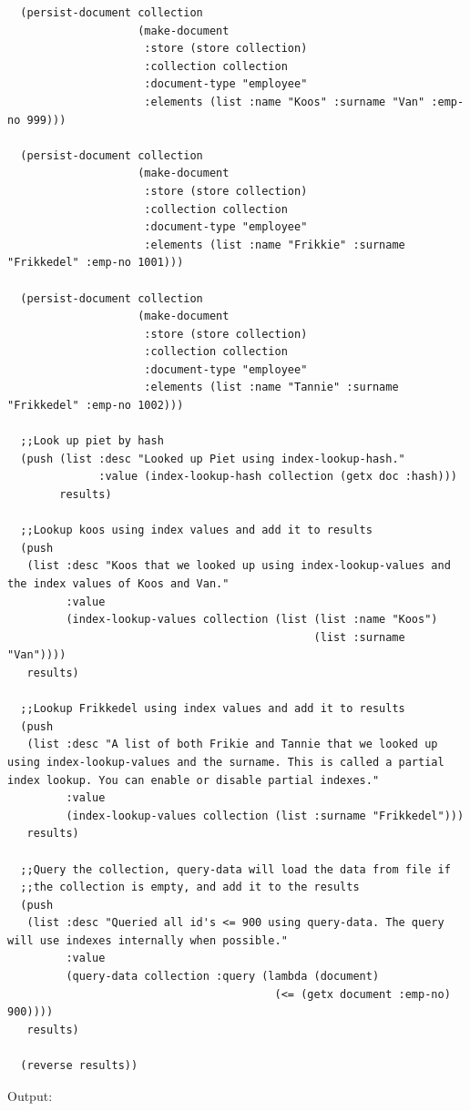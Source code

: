 \documentclass[11pt]{article}
\begin{document}
\begin{verbatim}
  (persist-document collection
                    (make-document
                     :store (store collection)
                     :collection collection
                     :document-type "employee"
                     :elements (list :name "Koos" :surname "Van" :emp-no 999)))

  (persist-document collection
                    (make-document
                     :store (store collection)
                     :collection collection
                     :document-type "employee"
                     :elements (list :name "Frikkie" :surname "Frikkedel" :emp-no 1001)))

  (persist-document collection
                    (make-document
                     :store (store collection)
                     :collection collection
                     :document-type "employee"
                     :elements (list :name "Tannie" :surname "Frikkedel" :emp-no 1002)))

  ;;Look up piet by hash
  (push (list :desc "Looked up Piet using index-lookup-hash."
              :value (index-lookup-hash collection (getx doc :hash)))
        results)

  ;;Lookup koos using index values and add it to results
  (push
   (list :desc "Koos that we looked up using index-lookup-values and the index values of Koos and Van."
         :value
         (index-lookup-values collection (list (list :name "Koos")
                                               (list :surname "Van"))))
   results)

  ;;Lookup Frikkedel using index values and add it to results
  (push
   (list :desc "A list of both Frikie and Tannie that we looked up using index-lookup-values and the surname. This is called a partial index lookup. You can enable or disable partial indexes."
         :value
         (index-lookup-values collection (list :surname "Frikkedel")))
   results)

  ;;Query the collection, query-data will load the data from file if
  ;;the collection is empty, and add it to the results
  (push
   (list :desc "Queried all id's <= 900 using query-data. The query will use indexes internally when possible."
         :value
         (query-data collection :query (lambda (document)
                                         (<= (getx document :emp-no) 900))))
   results)

  (reverse results))
\end{verbatim}

Output:
\end{document}
